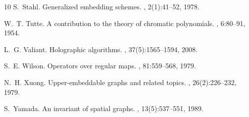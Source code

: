 \documentclass{amsart}
\theoremstyle{definition}
\theoremstyle{remark}
\numberwithin{equation}{section}
\begin{document}
\begin{thebibliography}{10}
S.~Stahl.
\newblock Generalized embedding schemes.
, 2(1):41--52, 1978.

W.~T. Tutte.
\newblock A contribution to the theory of chromatic polynomials.
, 6:80--91, 1954.

L.~G. Valiant.
\newblock Holographic algorithms.
, 37(5):1565--1594, 2008.

S.~E. Wilson.
\newblock Operators over regular maps.
, 81:559--568, 1979.

N.~H. Xuong.
\newblock Upper-embeddable graphs and related topics.
, 26(2):226--232, 1979.

S.~Yamada.
\newblock An invariant of spatial graphs.
, 13(5):537--551, 1989.

\end{thebibliography}
\end{document}
